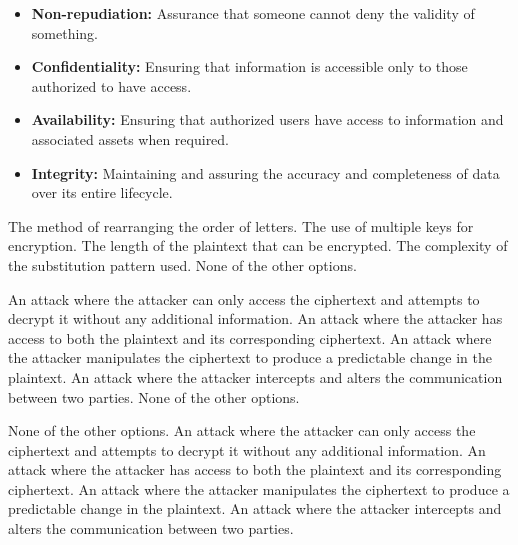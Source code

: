 \begin{solution}
    \begin{itemize}
        \item \textbf{Non-repudiation:} Assurance that someone cannot deny the validity of something.
        \item \textbf{Confidentiality:} Ensuring that information is accessible only to those authorized to have access.
        \item \textbf{Availability:} Ensuring that authorized users have access to information and associated assets when required.
        \item \textbf{Integrity:} Maintaining and assuring the accuracy and completeness of data over its entire lifecycle.
    \end{itemize}
\end{solution}

\begin{checkboxes}
    \choice The method of rearranging the order of letters.
    \choice The use of multiple keys for encryption.
    \choice The length of the plaintext that can be encrypted.
    \CorrectChoice The complexity of the substitution pattern used.
    \choice None of the other options.
\end{checkboxes}

\begin{checkboxes}
    \CorrectChoice An attack where the attacker can only access the ciphertext and attempts to decrypt it without any additional information.
    \choice An attack where the attacker has access to both the plaintext and its corresponding ciphertext.
    \choice An attack where the attacker manipulates the ciphertext to produce a predictable change in the plaintext.
    \choice An attack where the attacker intercepts and alters the communication between two parties.
    \choice None of the other options.
\end{checkboxes}

\begin{checkboxes}
    \CorrectChoice None of the other options.
    \choice An attack where the attacker can only access the ciphertext and attempts to decrypt it without any additional information.
    \choice An attack where the attacker has access to both the plaintext and its corresponding ciphertext.
    \choice An attack where the attacker manipulates the ciphertext to produce a predictable change in the plaintext.
    \choice An attack where the attacker intercepts and alters the communication between two parties.
\end{checkboxes}

